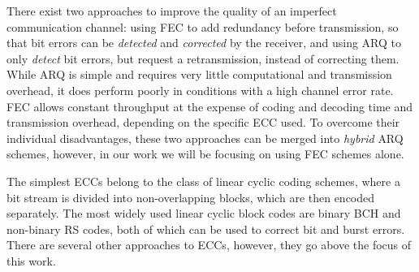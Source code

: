 There exist two approaches to improve the quality of an imperfect communication channel: using \ac{FEC} to add redundancy before transmission, so that bit errors can be \emph{detected} and \emph{corrected} by the receiver, and using \ac{ARQ} to only \emph{detect} bit errors, but request a retransmission, instead of correcting them.
While \ac{ARQ} is simple and requires very little computational and transmission overhead, it does perform poorly in conditions with a high channel error rate.
\ac{FEC} allows constant throughput at the expense of coding and decoding time and transmission overhead, depending on the specific \ac{ECC} used.
To overcome their individual disadvantages, these two approaches can be merged into \emph{hybrid} \ac{ARQ} schemes, however, in our work we will be focusing on using \ac{FEC} schemes alone.

The simplest \acp{ECC} belong to the class of linear cyclic coding schemes, where a bit stream is divided into non-overlapping blocks, which are then encoded separately.
The most widely used linear cyclic block codes are binary \ac{BCH} and non-binary \ac{RS} codes, both of which can be used to correct bit and burst errors.
There are several other approaches to \acp{ECC}, however, they go above the focus of this work.



